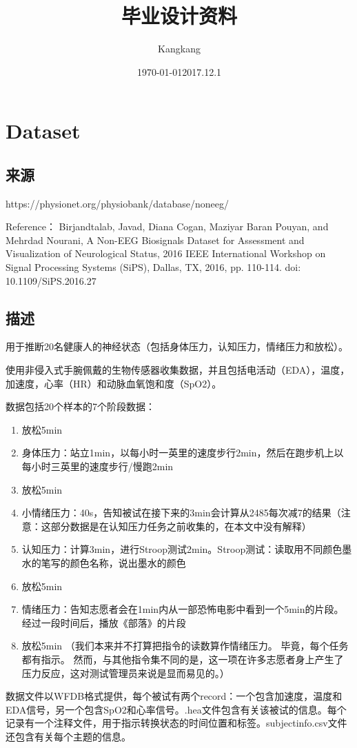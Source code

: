 \documentclass[UTF8]{ctexart}
\title{毕业设计资料}
\author{Kangkang}
\date{\today}
\begin{document}
\maketitle
\section{Dataset}
\date{2017.12.1}
\subsection{来源}
https://physionet.org/physiobank/database/noneeg/

Reference：
Birjandtalab, Javad, Diana Cogan, Maziyar Baran Pouyan, and Mehrdad Nourani, A Non-EEG Biosignals Dataset for Assessment and Visualization of Neurological Status, 2016 IEEE International Workshop on Signal Processing Systems (SiPS), Dallas, TX, 2016, pp. 110-114. doi: 10.1109/SiPS.2016.27
\subsection{描述}
用于推断20名健康人的神经状态（包括身体压力，认知压力，情绪压力和放松）。

使用非侵入式手腕佩戴的生物传感器收集数据，并且包括电活动（EDA），温度，加速度，心率（HR）和动脉血氧饱和度（SpO2）。

数据包括20个样本的7个阶段数据：
\begin{enumerate}
\item 放松5min
\item 身体压力：站立1min，以每小时一英里的速度步行2min，然后在跑步机上以每小时三英里的速度步行/慢跑2min
\item 放松5min
\item 小情绪压力：40s，告知被试在接下来的3min会计算从2485每次减7的结果（注意：这部分数据是在认知压力任务之前收集的，在本文中没有解释）
\item 认知压力：计算3min，进行Stroop测试2min。Stroop测试：读取用不同颜色墨水的笔写的颜色名称，说出墨水的颜色
\item 放松5min
\item 情绪压力：告知志愿者会在1min内从一部恐怖电影中看到一个5min的片段。 经过一段时间后，播放《部落》的片段
\item 放松5min
（我们本来并不打算把指令的读数算作情绪压力。 毕竟，每个任务都有指示。 然而，与其他指令集不同的是，这一项在许多志愿者身上产生了压力反应，这对测试管理员来说是显而易见的。）
\end{enumerate}
数据文件以WFDB格式提供，每个被试有两个record：一个包含加速度，温度和EDA信号，另一个包含SpO2和心率信号。.hea文件包含有关该被试的信息。每个记录有一个注释文件，用于指示转换状态的时间位置和标签。subjectinfo.csv文件还包含有关每个主题的信息。
\end{document}

